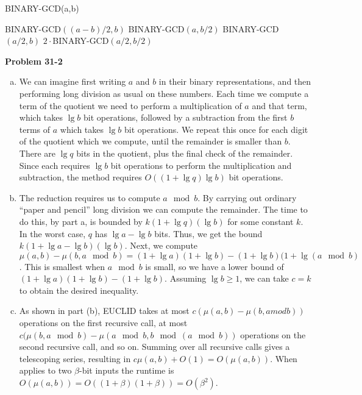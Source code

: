 \documentclass{article}
\begin{document}
\begin{enumerate}[a.]
\begin{algorithm}
\caption{BINARY-GCD(a,b)}
\begin{algorithmic}
\State \Return BINARY-GCD$((a-b)/2,b)$
\Else
\State \Return BINARY-GCD$(a,b/2)$
\EndIf
\Else
{}
\State \Return BINARY-GCD$(a/2,b)$
\Else
\State \Return $2\cdot $BINARY-GCD$(a/2,b/2)$
\EndIf
\EndIf
\end{algorithmic}
\end{algorithm}
\end{enumerate}

\noindent\textbf{Problem 31-2}\\

\begin{enumerate}[a.]
\item We can imagine first writing $a$ and $b$ in their binary representations, and then performing long division as usual on these numbers.  Each time we compute a term of the quotient we need to perform a multiplication of $a$ and that term, which takes $\lg b$ bit operations, followed by a subtraction from the first $b$ terms of $a$ which takes $\lg b$ bit operations.  We repeat this once for each digit of the quotient which we compute, until the remainder is smaller than $b$.  There are $\lg q$ bits in the quotient, plus the final check of the remainder.  Since each requires $\lg b$ bit operations to perform the multiplication and subtraction, the method requires $O((1 + \lg q)\lg b)$ bit operations. \\

\item The reduction requires us to compute $a \mod b$.  By carrying out ordinary ``paper and pencil'' long division we can compute the remainder.  The time to do this, by part a, is bounded by $k(1 + \lg q)(\lg b)$ for some constant $k$.  In the worst case, $q$ has $\lg a - \lg b$ bits.  Thus, we get the bound $k(1 + \lg a - \lg b)(\lg b)$.  Next, we compute $\mu(a,b) - \mu(b,a \mod b) = (1+\lg a)(1+\lg b) - (1 + \lg b)(1+\lg(a \mod b)$.  This is smallest when $a \mod b$ is small, so we have a lower bound of $(1+\lg a)(1+\lg b) - (1+\lg b)$.  Assuming $\lg b \geq 1$, we can take $c = k$ to obtain the desired inequality. 

\item As shown in part (b), EUCLID takes at most $c(\mu(a,b) - \mu(b,a mod b))$ operations on the first recursive call, at most $c(\mu(b,a\mod b) - \mu(a \mod b, b \mod (a \mod b))$ operations on the second recursive call, and so on. Summing over all recursive calls gives a telescoping series, resulting in $c\mu(a,b) + O(1) = O(\mu(a,b))$. When applies to two $\beta$-bit inputs the runtime is $O(\mu(a,b)) = O((1+\beta)(1+\beta)) = O(\beta^2)$. 
\end{enumerate}
\end{document}
